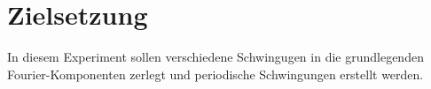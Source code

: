 \section{Zielsetzung}
\label{sec:Zielsetzung}

In diesem Experiment sollen verschiedene Schwingugen in die grundlegenden 
Fourier-Komponenten zerlegt und periodische Schwingungen erstellt werden.